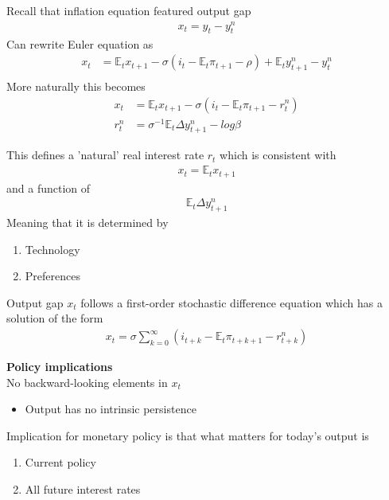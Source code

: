 \documentclass{beamer}
\begin{document}
\begin{frame}
  Recall that inflation equation featured output gap  
  \begin{align}
    x_t=y_t-y_t^n  
  \end{align}
  Can rewrite Euler equation as
\begin{align}
  x_t &= \mathbb{E}_t x_{t+1} - \sigma (i_t - \mathbb{E}_t \pi_{t+1} - \rho) + \mathbb{E}_t y_{t+1}^n - y_t^n\\  
\end{align}
\medskip
More naturally this becomes
\begin{align}
  x_t &= \mathbb{E}_t x_{t+1} - \sigma (i_t - \mathbb{E}_t \pi_{t+1} - r_t^n) \\ 
  r_t^n&=\sigma^{-1}\mathbb{E}_t\Delta y_{t+1}^n - log \beta  
\end{align}
\end{frame}

\begin{frame}
  This defines a 'natural' real interest rate $r_t$ which is consistent with
  \begin{align}
    x_t=\mathbb{E}_tx_{t+1}
  \end{align}
  and a function of   
  \begin{align}
    \mathbb{E}_t \Delta y_{t+1}^n
  \end{align}
  \medskip
  Meaning that it is determined by 
  \begin{enumerate}
    \item Technology
    \item Preferences
  \end{enumerate}
  Output gap $x_t$ follows a first-order stochastic difference equation which has a solution of the form
\begin{align}
  x_t = \sigma \sum_{k=0}^{\infty} (i_{t+k} - \mathbb{E}_t \pi_{t+k+1} - r_{t+k}^n)  
\end{align}  
\end{frame}

\begin{frame}
  \textbf{Policy implications}\\
  No backward-looking elements in $x_t$
  \begin{itemize}
    \item Output has no intrinsic persistence
  \end{itemize}
  \medskip
  Implication for monetary policy is that what matters for today's output is
   \begin{enumerate}
     \item Current policy
     \item All future interest rates
   \end{enumerate}
\end{frame}
\end{document}
